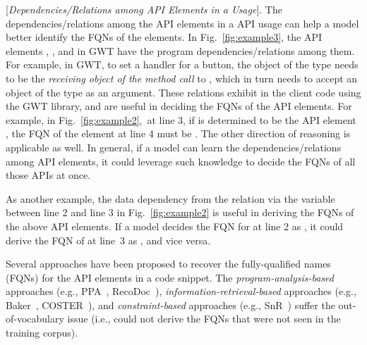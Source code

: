 \vspace{2pt}
 [{\em Dependencies/Relations among API
    Elements in a Usage}]. The dependencies/relations among the API
elements in a API usage can help a model better identify the FQNs of
the elements.  In Fig.~\ref{fig:example3}, the API elements
, , and  in GWT
have the program dependencies/relations among them. For example, in
GWT, to set a handler for a button, the object of the type
 needs to be the {\em receiving object of the method
  call} to , which in turn needs to accept an
object of the type  as an argument. These relations
exhibit in the client code using the GWT library, and are useful in
deciding the FQNs of the API elements. For example, in
Fig.~\ref{fig:example2},~at line 3, if  is
determined to be the API element
, the
FQN of the element at line 4 must be
.  The
other direction of reasoning is applicable as well. In general, if a
model can learn the dependencies/relations among API elements, it
could leverage such knowledge to decide the FQNs of all those APIs at once.


As another example, the data dependency from the 
relation via the variable  between line 2 and line 3 in
Fig.~\ref{fig:example2} is useful in deriving the FQNs of the
above API elements. If a model decides the FQN for  at
line 2 as , it
could derive the FQN of  at line~3 as
,
and vice versa.

\vspace{2pt}
 Several approaches have
been proposed to recover the fully-qualified names (FQNs) for the API
elements in a code snippet. The {\em program-analysis-based}
approaches (e.g., PPA~\cite{dagenais-oopsla08},
RecoDoc~\cite{dagenais-icse12}), {\em information-retrieval-based}
approaches (e.g., Baker~\cite{liveapi14}, COSTER~\cite{coster-ase19}),
and {\em constraint-based} approaches (e.g., SnR~\cite{snr-icse22})
suffer the out-of-vocabulary issue (i.e., could not derive the FQNs
that were not seen in the training corpus).

